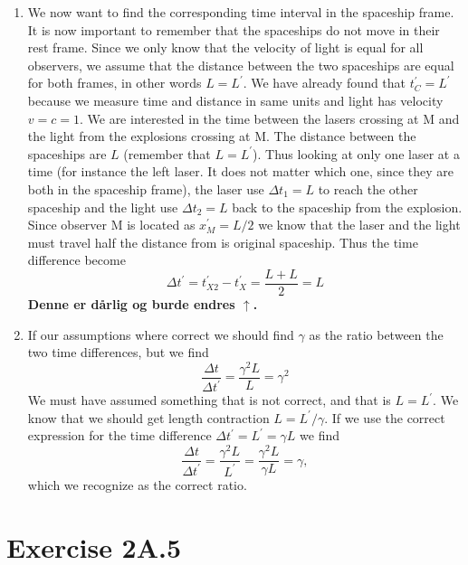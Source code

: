 \documentclass[a4paper,10pt,english]{article}
\begin{document}
\begin{enumerate}
\item We now want to find the corresponding time interval in the spaceship frame. It is now important to remember that the spaceships do not move in their rest frame. Since we only know that the velocity of light is equal for all observers, we assume that the distance between the two spaceships are equal for both frames, in other words $L=L^{\prime}$. We have already found that $t_{C}^{\prime}=L^{\prime}$ because we measure time and distance in same units and light has velocity $v=c=1$. We are interested in the time between the lasers crossing at M and the light from the explosions crossing at M. The distance between the spaceships are $L$ (remember that $L=L^{\prime}$). Thus looking at only one laser at a time (for instance the left laser. It does not matter which one, since they are both  in the spaceship frame), the laser use $\Delta t_{1}=L$ to reach the other spaceship and the light use $\Delta t_{2}=L$ back to the spaceship from the explosion. Since observer M is located as $x_{M}^{\prime}=L/2$ we know that the laser and the light must travel half the distance from is original spaceship. Thus the time difference become
\[\Delta t^{\prime}=t_{X2}^{\prime}-t_{X}^{\prime}=\frac{L+L}{2}=L\]
\textbf{Denne er dårlig og burde endres $\uparrow$.}

\item If our assumptions where correct we should find $\gamma$ as the ratio between the two time differences, but we find
\[\frac{\Delta t}{\Delta t^{\prime}}=\frac{\gamma^{2}L}{L}=\gamma^{2}\]
We must have assumed something that is not correct, and that is $L=L^{\prime}$. We know that we should get length contraction $L=L^{\prime}/\gamma$. If we use the correct expression for the time difference $\Delta t^{\prime}=L^{\prime}=\gamma L$ we find
\[\frac{\Delta t}{\Delta t^{\prime}}=\frac{\gamma^{2}L}{L^{\prime}}=\frac{\gamma^{2}L}{\gamma L}=\gamma,\]
which we recognize as the correct ratio.

\end{enumerate}








\section*{Exercise 2A.5}
\end{document}
